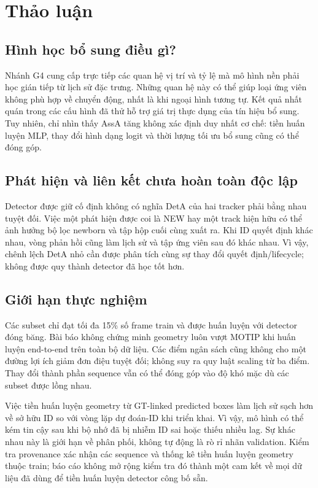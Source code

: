 \FloatBarrier
\FloatBarrier
\section{Thảo luận}
\FloatBarrier
\subsection{Hình học bổ sung điều gì?}
Nhánh G4 cung cấp trực tiếp các quan hệ vị trí và tỷ lệ mà mô hình nền phải học gián tiếp từ lịch sử đặc trưng. Những quan hệ này có thể giúp loại ứng viên không phù hợp về chuyển động, nhất là khi ngoại hình tương tự. Kết quả nhất quán trong các cấu hình đã thử hỗ trợ giá trị thực dụng của tín hiệu bổ sung. Tuy nhiên, chỉ nhìn thấy AssA tăng không xác định duy nhất cơ chế: tiền huấn luyện MLP, thay đổi hình dạng logit và thời lượng tối ưu bổ sung cũng có thể đóng góp.

\FloatBarrier
\subsection{Phát hiện và liên kết chưa hoàn toàn độc lập}
Detector được giữ cố định không có nghĩa DetA của hai tracker phải bằng nhau tuyệt đối. Việc một phát hiện được coi là NEW hay một track hiện hữu có thể ảnh hưởng bộ lọc newborn và tập hộp cuối cùng xuất ra. Khi ID quyết định khác nhau, vòng phản hồi cũng làm lịch sử và tập ứng viên sau đó khác nhau. Vì vậy, chênh lệch DetA nhỏ cần được phân tích cùng sự thay đổi quyết định/lifecycle; không được quy thành detector đã học tốt hơn.

\FloatBarrier
\subsection{Giới hạn thực nghiệm}
Các subset chỉ đạt tối đa 15\% số frame train và được huấn luyện với detector đóng băng. Bài báo không chứng minh geometry luôn vượt MOTIP khi huấn luyện end-to-end trên toàn bộ dữ liệu. Các điểm ngân sách cũng không cho một đường lợi ích giảm đơn điệu tuyệt đối; không suy ra quy luật scaling từ ba điểm. Thay đổi thành phần sequence vẫn có thể đóng góp vào độ khó mặc dù các subset được lồng nhau.

Việc tiền huấn luyện geometry từ GT-linked predicted boxes làm lịch sử sạch hơn về sở hữu ID so với vòng lặp dự đoán-ID khi triển khai. Vì vậy, mô hình có thể kém tin cậy sau khi bộ nhớ đã bị nhiễm ID sai hoặc thiếu nhiều lag. Sự khác nhau này là giới hạn về phân phối, không tự động là rò rỉ nhãn validation. Kiểm tra provenance xác nhận các sequence và thống kê tiền huấn luyện geometry thuộc train; báo cáo không mở rộng kiểm tra đó thành một cam kết về mọi dữ liệu đã dùng để tiền huấn luyện detector công bố sẵn.

